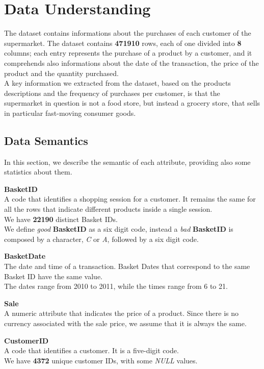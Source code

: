 \section{Data Understanding}

The dataset contains informations about the purchases of each customer of the supermarket. The dataset contains \textbf{471910} rows, each of one divided into \textbf{8} columns; each entry represents the purchase of a product by a customer, and it comprehends also informations about the date of the transaction, the price of the product and the quantity purchased.\\
A key information we extracted from the dataset, based on the products descriptions and the frequency of purchases per customer, is that the supermarket in question is not a food store, but instead a grocery store, that sells in particular fast-moving consumer goods.

\subsection{Data Semantics}

In this section, we describe the semantic of each attribute, providing also some statistics about them.

\textbf{BasketID} \\
A code that identifies a shopping session for a customer. It remains the same for all the rows that indicate different products inside a single session.\\
We have \textbf{22190} distinct Basket IDs.\\
We define \emph{good} \textbf{BasketID} as a six digit code, instead a \emph{bad} \textbf{BasketID} is composed by a character, \emph{C} or \emph{A}, followed by a six digit code.

\textbf{BasketDate}\\
The date and time of a transaction. Basket Dates that correspond to the same Basket ID have the same value.\\
The dates range from 2010 to 2011, while the times range from 6 to 21.

\textbf{Sale}\\
A numeric attribute that indicates the price of a product.
Since there is no currency associated with the sale price, we assume that it is always the same.

\textbf{CustomerID}\\
A code that identifies a customer. It is a five-digit code.\\
We have \textbf{4372} unique customer IDs, with some \emph{NULL} values.

